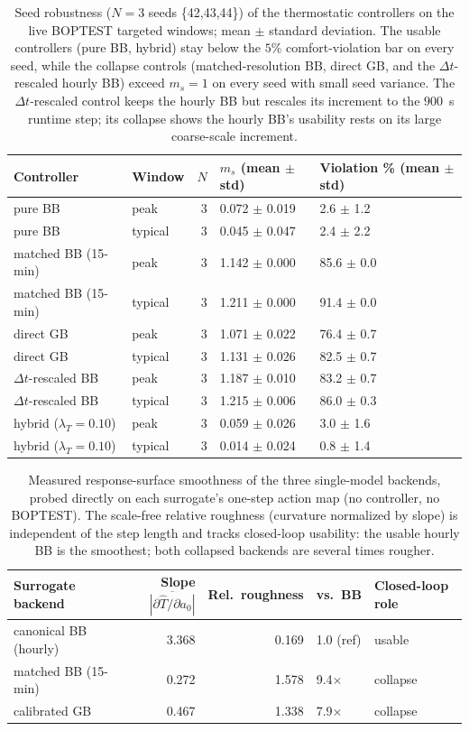 \documentclass[11pt,a4paper]{article}
\begin{document}
\begin{table}[H]
\centering
\caption{Seed robustness ($N=3$ seeds \{42,43,44\}) of the thermostatic controllers on the live BOPTEST targeted windows; mean $\pm$ standard deviation. The usable controllers (pure BB, hybrid) stay below the $5\%$ comfort-violation bar on every seed, while the collapse controls (matched-resolution BB, direct GB, and the $\Delta t$-rescaled hourly BB) exceed $m_s=1$ on every seed with small seed variance. The $\Delta t$-rescaled control keeps the hourly BB but rescales its increment to the $900$~s runtime step; its collapse shows the hourly BB's usability rests on its large coarse-scale increment.}
\label{tab:seed_band}
\small
\begin{tabular}{llrll}
\toprule
Controller & Window & $N$ & $m_s$ (mean $\pm$ std) & Violation \% (mean $\pm$ std) \\
\midrule
pure BB & peak & 3 & 0.072 $\pm$ 0.019 & 2.6 $\pm$ 1.2 \\
pure BB & typical & 3 & 0.045 $\pm$ 0.047 & 2.4 $\pm$ 2.2 \\
matched BB (15-min) & peak & 3 & 1.142 $\pm$ 0.000 & 85.6 $\pm$ 0.0 \\
matched BB (15-min) & typical & 3 & 1.211 $\pm$ 0.000 & 91.4 $\pm$ 0.0 \\
direct GB & peak & 3 & 1.071 $\pm$ 0.022 & 76.4 $\pm$ 0.7 \\
direct GB & typical & 3 & 1.131 $\pm$ 0.026 & 82.5 $\pm$ 0.7 \\
$\Delta t$-rescaled BB & peak & 3 & 1.187 $\pm$ 0.010 & 83.2 $\pm$ 0.7 \\
$\Delta t$-rescaled BB & typical & 3 & 1.215 $\pm$ 0.006 & 86.0 $\pm$ 0.3 \\
hybrid ($\lambda_T{=}0.10$) & peak & 3 & 0.059 $\pm$ 0.026 & 3.0 $\pm$ 1.6 \\
hybrid ($\lambda_T{=}0.10$) & typical & 3 & 0.014 $\pm$ 0.024 & 0.8 $\pm$ 1.4 \\
\bottomrule
\end{tabular}
\end{table}
\begin{table}[H]
\centering
\caption{Measured response-surface smoothness of the three single-model backends, probed directly on each surrogate's one-step action map (no controller, no BOPTEST). The scale-free relative roughness (curvature normalized by slope) is independent of the step length and tracks closed-loop usability: the usable hourly BB is the smoothest; both collapsed backends are several times rougher.}
\label{tab:surface_sharpness}
\small
\begin{tabular}{lrrll}
\toprule
Surrogate backend & Slope $\overline{|\partial\hat T/\partial a_0|}$ & Rel.\ roughness & vs.\ BB & Closed-loop role \\
\midrule
canonical BB (hourly) & 3.368 & 0.169 & 1.0 (ref) & usable \\
matched BB (15-min) & 0.272 & 1.578 & 9.4$\times$ & collapse \\
calibrated GB & 0.467 & 1.338 & 7.9$\times$ & collapse \\
\bottomrule
\end{tabular}
\end{table}
\end{document}

